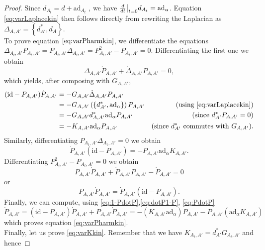 \documentclass[11pt,a4paper]{amsart}
\theoremstyle{plain} %
\theoremstyle{definition}
\theoremstyle{remark}
\newcommand{\dd}{d}
\newcommand\restr[2]{{%
  \left.\kern-\nulldelimiterspace %
  #1 %
  \vphantom{\big|} %
  \right|_{#2} %
  }}
\begin{document}
\begin{proof}
Since $\dd_{A_t} = d + \mathrm{ad}_{A_t}$ %
, we have  $\restr{\frac{d}{dt}}{t=0}{\dd}_{A_t} = \mathrm{ad}_\alpha$. %
Equation \eqref{eq:varLaplacekin} then follows directly from rewriting the Laplacian as $\Delta_{A,A'} = \left\lbrace \dd^*_{A'},\dd_{A}\right\rbrace$. \\
To prove equation $\eqref{eq:varPharmkin}$, we differentiate the equations $\Delta_{A_t,A'}P_{A_t,A'} = P_{A_t,A'}\Delta_{A_t,A'} = P^2_{A_t,A'}-P_{A_t,A'} =0$. Differentiating the first one we obtain 
$$\Delta_{A,A'}\dot{P}_{A,A'} + \dot{\Delta}_{A,A'}P_{A,A'} = 0,$$
which yields, after composing with $G_{A,A'}$, 
\begin{align}(\mathrm{id} - P_{A,A'})\dot{P}_{A,A'} &= - G_{A,A'} \dot{\Delta}_{A,A'}P_{A,A'}  & \notag \\
 &= -G_{A,A'}\left(\left\lbrace \dd^*_{A'},\mathrm{ad}_\alpha\right\rbrace \right) P_{A,A'} &\text{(using \eqref{eq:varLaplacekin})} \notag\\
 &= -G_{A,A'}\dd^*_{A,A'}\mathrm{ad}_{\alpha}P_{A,A'}  &\text{(since } \dd^*_{A'}P_{A,A'}  = 0) \notag \\
 &= - K_{A,A'}\mathrm{ad}_{\alpha}P_{A,A'}  %
 &\text{(since } \dd^*_{A'} %
 \text{ commutes with } G_{A,A'}).\label{eq:1-PdotP}
\end{align}
Similarly, differentiating $P_{A_t,A'}\Delta_{A_t,A'} = 0$ we obtain 
\begin{equation} \dot{P}_{A,A'}(\mathrm{id} - P_{A,A'}) = - P_{A,A'}\mathrm{ad}_{\alpha}K_{A,A'}.\label{eq:dotP1-P}
\end{equation}
Differentiating $P^2_{A_t,A'} - P_{A_t,A'} = 0$ we obtain 
$$P_{A,A'}\dot{P}_{A,A'} + \dot{P}_{A,A'}P_{A,A'} - \dot{P}_{A,A'} = 0 $$ or 
\begin{equation}P_{A,A'}\dot{P}_{A,A'} = \dot{P}_{A,A'}(\mathrm{id} - P_{A,A'}) .\label{eq:PdotP}
\end{equation}
Finally, we can compute, using \eqref{eq:1-PdotP},\eqref{eq:dotP1-P}, \eqref{eq:PdotP}
$$\dot{P}_{A,A'} = (\mathrm{id} - P_{A,A'})\dot{P}_{A,A'} + P_{A,A'}\dot{P}_{A,A'} = -\left(K_{A,A'}\mathrm{ad}_\alpha %
\right)P_{A,A'} - P_{A,A'}\left(\mathrm{ad}_\alpha K_{A,A'} \right)$$
which proves equation \eqref{eq:varPharmkin}. \\ 
Finally, let us prove \eqref{eq:varKkin}. Remember that we have $K_{A_t,A'} = \dd^*_{A'}   G_{A_t,A'}$ and hence 

\end{proof}
\end{document}
